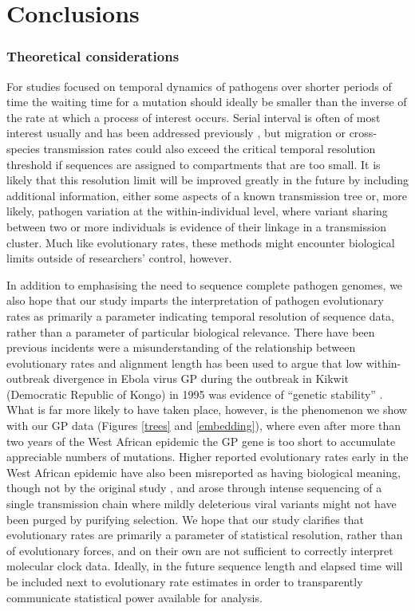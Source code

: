 \documentclass[11pt,oneside,letterpaper]{article}
\begin{document}
\section*{Conclusions}
\subsubsection*{Theoretical considerations}
For studies focused on temporal dynamics of pathogens over shorter periods of time the waiting time for a mutation should ideally be smaller than the inverse of the rate at which a process of interest occurs.
Serial interval is often of most interest usually and has been addressed previously \citep{campbell_when_2018,grubaugh_tracking_2019}, but migration or cross-species transmission rates could also exceed the critical temporal resolution threshold if sequences are assigned to compartments that are too small.
It is likely that this resolution limit will be improved greatly in the future by including additional information, either some aspects of a known transmission tree or, more likely, pathogen variation at the within-individual level, where variant sharing between two or more individuals is evidence of their linkage in a transmission cluster.
Much like evolutionary rates, these methods might encounter biological limits outside of researchers' control, however.

In addition to emphasising the need to sequence complete pathogen genomes, we also hope that our study imparts the interpretation of pathogen evolutionary rates as primarily a parameter indicating temporal resolution of sequence data, rather than a parameter of particular biological relevance.
There have been previous incidents were a misunderstanding of the relationship between evolutionary rates and alignment length has been used to argue that low within-outbreak divergence in Ebola virus GP during the outbreak in Kikwit (Democratic Republic of Kongo) in 1995 was evidence of ``genetic stability'' \citep{rodriguez_persistence_1999}.
What is far more likely to have taken place, however, is the phenomenon we show with our GP data (Figures \ref{trees} and \ref{embedding}), where even after more than two years of the West African epidemic the GP gene is too short to accumulate appreciable numbers of mutations.
Higher reported evolutionary rates early in the West African epidemic \citep{gire_genomic_2014} have also been misreported as having biological meaning, though not by the original study \citep{holmes_evolution_2016,rambaut_comment_2016}, and arose through intense sequencing of a single transmission chain where mildly deleterious viral variants might not have been purged by purifying selection.
We hope that our study clarifies that evolutionary rates are primarily a parameter of statistical resolution, rather than of evolutionary forces, and on their own are not sufficient to correctly interpret molecular clock data.
Ideally, in the future sequence length and elapsed time will be included next to evolutionary rate estimates in order to transparently communicate statistical power available for analysis.
\end{document}
